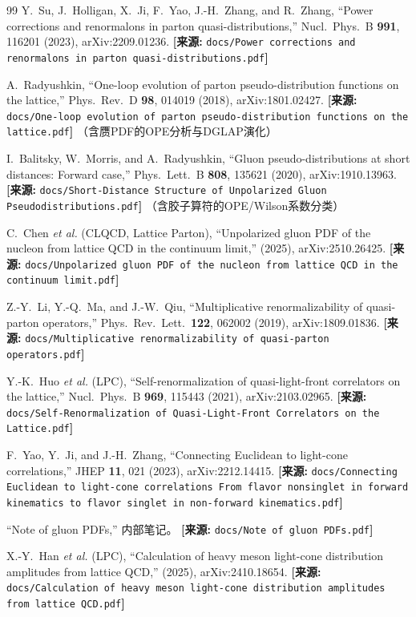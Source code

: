 \documentclass[12pt,a4paper]{ctexart}
\theoremstyle{definition}
\begin{document}
\begin{thebibliography}{99}
Y.~Su, J.~Holligan, X.~Ji, F.~Yao, J.-H.~Zhang, and R.~Zhang,
``Power corrections and renormalons in parton quasi-distributions,''
Nucl.\ Phys.\ B \textbf{991}, 116201 (2023), arXiv:2209.01236.
\quad\textbf{[来源:} \texttt{docs/Power corrections and renormalons in parton quasi-distributions.pdf}\textbf{]}

A.~Radyushkin,
``One-loop evolution of parton pseudo-distribution functions on the lattice,''
Phys.\ Rev.\ D \textbf{98}, 014019 (2018), arXiv:1801.02427.
\quad\textbf{[来源:} \texttt{docs/One-loop evolution of parton pseudo-distribution functions on the lattice.pdf}\textbf{]}
（含赝PDF的OPE分析与DGLAP演化）

I.~Balitsky, W.~Morris, and A.~Radyushkin,
``Gluon pseudo-distributions at short distances: Forward case,''
Phys.\ Lett.\ B \textbf{808}, 135621 (2020), arXiv:1910.13963.
\quad\textbf{[来源:} \texttt{docs/Short-Distance Structure of Unpolarized Gluon Pseudodistributions.pdf}\textbf{]}
（含胶子算符的OPE/Wilson系数分类）

C.~Chen \textit{et al.} (CLQCD, Lattice Parton),
``Unpolarized gluon PDF of the nucleon from lattice QCD in the continuum limit,''
(2025), arXiv:2510.26425.
\quad\textbf{[来源:} \texttt{docs/Unpolarized gluon PDF of the nucleon from lattice QCD in the continuum limit.pdf}\textbf{]}

Z.-Y.~Li, Y.-Q.~Ma, and J.-W.~Qiu,
``Multiplicative renormalizability of quasi-parton operators,''
Phys.\ Rev.\ Lett.\ \textbf{122}, 062002 (2019), arXiv:1809.01836.
\quad\textbf{[来源:} \texttt{docs/Multiplicative renormalizability of quasi-parton operators.pdf}\textbf{]}

Y.-K.~Huo \textit{et al.} (LPC),
``Self-renormalization of quasi-light-front correlators on the lattice,''
Nucl.\ Phys.\ B \textbf{969}, 115443 (2021), arXiv:2103.02965.
\quad\textbf{[来源:} \texttt{docs/Self-Renormalization of Quasi-Light-Front Correlators on the Lattice.pdf}\textbf{]}

F.~Yao, Y.~Ji, and J.-H.~Zhang,
``Connecting Euclidean to light-cone correlations,''
JHEP \textbf{11}, 021 (2023), arXiv:2212.14415.
\quad\textbf{[来源:} \texttt{docs/Connecting Euclidean to light-cone correlations From flavor nonsinglet in forward kinematics to flavor singlet in non-forward kinematics.pdf}\textbf{]}

``Note of gluon PDFs,'' 内部笔记。
\quad\textbf{[来源:} \texttt{docs/Note of gluon PDFs.pdf}\textbf{]}

X.-Y.~Han \textit{et al.} (LPC),
``Calculation of heavy meson light-cone distribution amplitudes from lattice QCD,''
(2025), arXiv:2410.18654.
\quad\textbf{[来源:} \texttt{docs/Calculation of heavy meson light-cone distribution amplitudes from lattice QCD.pdf}\textbf{]}

\end{thebibliography}
\end{document}
